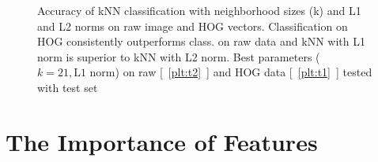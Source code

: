 \begin{figure}[h!]
\newcommand{\plotref}[1]{{[~\ref{plt:#1}~]}}
\centering

\caption{Accuracy of kNN classification with neighborhood sizes (k) and L1 and L2 norms on raw image and HOG vectors. Classification on HOG consistently outperforms class. on raw data and kNN with L1 norm is superior to kNN with L2 norm. Best parameters ($k=21, \text{L1 norm}$) on raw \plotref{t2} and HOG data \plotref{t1} tested with test set}

\end{figure}


\section{The Importance of Features} %
